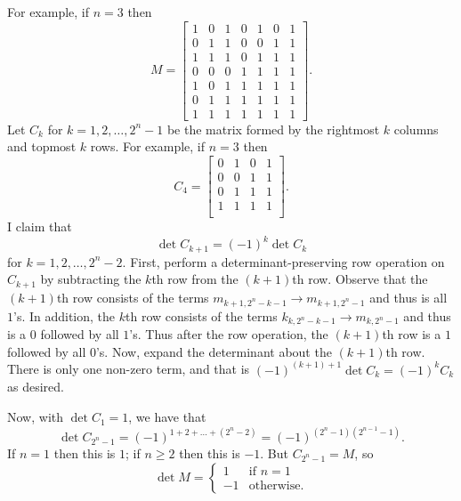 For example, if $n=3$ then \[M=
\begin{bmatrix}
	1 & 0 & 1 & 0 & 1 & 0 & 1 \\
	0 & 1 & 1 & 0 & 0 & 1 & 1 \\
	1 & 1 & 1 & 0 & 1 & 1 & 1 \\
	0 & 0 & 0 & 1 & 1 & 1 & 1 \\
	1 & 0 & 1 & 1 & 1 & 1 & 1 \\
	0 & 1 & 1 & 1 & 1 & 1 & 1 \\
	1 & 1 & 1 & 1 & 1 & 1 & 1
\end{bmatrix}.
\]
Let $C_k$ for $k=1,2,\ldots,2^n-1$ be the matrix formed by the rightmost $k$ columns and topmost $k$ rows. For example, if $n=3$ then \[C_4=
\begin{bmatrix}
	0 & 1 & 0 & 1 \\
	0 & 0 & 1 & 1 \\
	0 & 1 & 1 & 1 \\
	1 & 1 & 1 & 1 \\
\end{bmatrix}.
\]
I claim that \[\det C_{k+1}=\left(-1\right)^k\det C_k\] for $k=1,2,\ldots,2^n-2$. First, perform a determinant-preserving row operation on $C_{k+1}$ by subtracting the $k$th row from the $\left(k+1\right)$th row. Observe that the $\left(k+1\right)$th row consists of the terms $m_{k+1,2^n-k-1}\to m_{k+1,2^n-1}$ and thus is all $1$'s. In addition, the $k$th row consists of the terms $k_{k,2^n-k-1}\to m_{k,2^n-1}$ and thus is a $0$ followed by all $1$'s. Thus after the row operation, the $\left(k+1\right)$th row is a $1$ followed by all $0$'s. Now, expand the determinant about the $\left(k+1\right)$th row. There is only one non-zero term, and that is $\left(-1\right)^{\left(k+1\right)+1}\det C_k=\left(-1\right)^kC_k$ as desired.

Now, with $\det C_1=1$, we have that \[\det C_{2^n-1}=\left(-1\right)^{1+2+\ldots+\left(2^n-2\right)}=\left(-1\right)^{\left(2^n-1\right)\left(2^{n-1}-1\right)}.\] If $n=1$ then this is $1$; if $n\geq2$ then this is $-1$. But $C_{2^n-1}=M$, so \[\det M=
\begin{cases}
	1 & \text{if }n=1 \\
	-1 & \text{otherwise.}
\end{cases}
\]